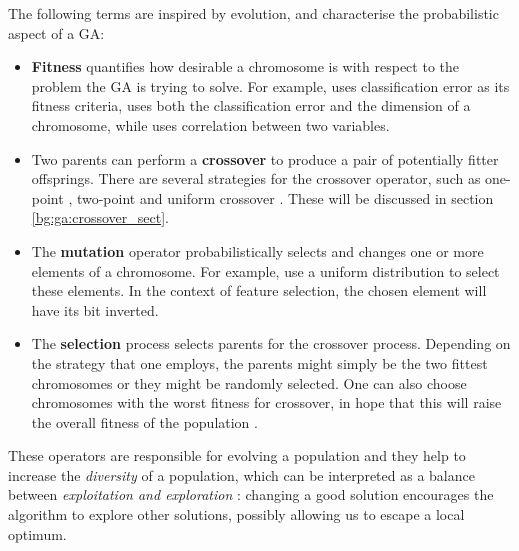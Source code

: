\documentclass[12pt, twoside, a4paper]{report}
\begin{document}
The following terms are inspired by evolution, and characterise the probabilistic aspect of a GA:
\begin{itemize}
  \item \textbf{Fitness} quantifies how desirable a chromosome is with respect to the problem the GA is trying to solve. For example, \cite{RefWorks:204} uses classification error as its fitness criteria, \cite{RefWorks:200} uses both the classification error and the dimension of a chromosome, while \cite{RefWorks:201} uses correlation between two variables.
  
  \item Two parents can perform a \textbf{crossover} to produce a pair of potentially fitter offsprings. There are several strategies for the crossover operator, such as one-point \cite{RefWorks:201}, two-point \cite{RefWorks:202, RefWorks:204} and uniform crossover \cite{RefWorks:222}. These will be discussed in section \ref{bg:ga:crossover_sect}.
  
  \item The \textbf{mutation} operator probabilistically selects and changes one or more elements of a chromosome. For example, \cite{RefWorks:201, RefWorks:204} use a uniform distribution to select these elements. In the context of feature selection, the chosen element will have its bit inverted.

  \item The \textbf{selection} process selects parents for the crossover process. Depending on the strategy that one employs, the parents might simply be the two fittest chromosomes or they might be randomly selected. One can also choose chromosomes with the worst fitness for crossover, in hope that this will raise the overall fitness of the population \cite{RefWorks:203}.
  
  
\end{itemize}

These operators are responsible for evolving a population and they help to increase the \textit{diversity} of a population, which can be interpreted as a balance between \textit{exploitation and exploration} \cite{RefWorks:236}: changing a good solution encourages the algorithm to explore other solutions, possibly allowing us to escape a local optimum.
\end{document}
